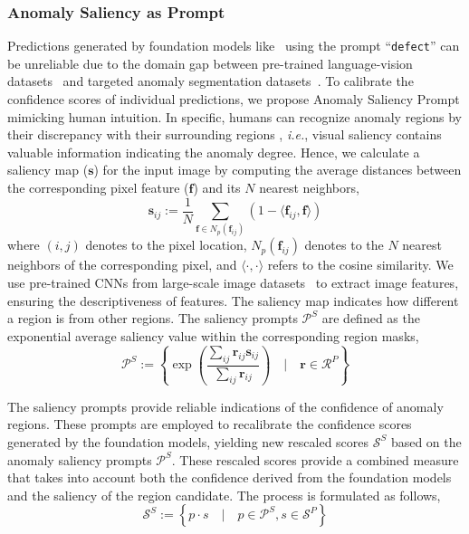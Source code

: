 \documentclass{article}
\begin{document}
\subsubsection{Anomaly Saliency as Prompt}
Predictions generated by foundation models like~\cite{liu2023grounding} using the prompt ``\verb|defect|'' can be unreliable due to the domain gap between pre-trained language-vision datasets~\cite{Laion400} and targeted anomaly segmentation datasets~\cite{bergmann2019mvtec,zou2022spot}. To calibrate the confidence scores of individual predictions, we propose Anomaly Saliency Prompt mimicking human intuition. In specific, humans can recognize anomaly regions by their discrepancy with their surrounding regions \cite{aota2023zero}, \textit{i.e.}, visual saliency contains valuable information indicating the anomaly degree. Hence, we calculate a saliency map ($\mathbf{s}$) for the input image by computing the average distances between the corresponding pixel feature ($\mathbf{f}$) and its $N$ nearest neighbors, 
\begin{equation}
\label{eq:saliency-map}
    \mathbf{s}_{ij} := \frac{1}{N}\sum\limits_{\mathbf{f}\in N_p(\mathbf{f}_{ij})}(1-  \langle \mathbf{f}_{ij},\mathbf{f}  \rangle)
\end{equation}
where $(i,j)$ denotes to the pixel location, $N_p(\mathbf{f}_{ij})$ denotes to the $N$ nearest neighbors of the corresponding pixel, and $\langle \cdot, \cdot \rangle$ refers to the cosine similarity. We use pre-trained CNNs from large-scale image datasets~\cite{hinton2012imagenet} to extract image features, ensuring the descriptiveness of features. The saliency map indicates how different a region is from other regions. The saliency prompts $\mathcal{P}^{S}$ are defined as the exponential average saliency value within the corresponding region masks, 
\begin{equation}
\label{eq:score_saliency}
    \mathcal{P}^{S} := \left\{ \exp(\frac{\sum_{i j}\mathbf{r}_{i j}\mathbf{s}_{i j}}{\sum_{i j}\mathbf{r}_{i j}}) \quad | \quad \mathbf{r} \in \mathcal{R}^P \right\}
\end{equation}

The saliency prompts provide reliable indications of the confidence of anomaly regions. These prompts are employed to recalibrate the confidence scores generated by the foundation models, yielding new rescaled scores $\mathcal{S}^{S}$ based on the anomaly saliency prompts $\mathcal{P}^{S}$. These rescaled scores provide a combined measure that takes into account both the confidence derived from the foundation models and the saliency of the region candidate. The process is formulated as follows,
\begin{equation}
\label{eq:rescore}
    \mathcal{S}^{S} := \left\{ p \cdot s  \quad | \quad   p \in \mathcal{P}^{S},   s \in \mathcal{S}^P \right\}
\end{equation}
\end{document}
